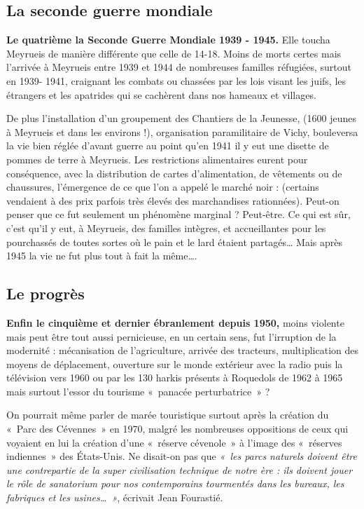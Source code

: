 \subsection{La seconde guerre mondiale}

\textbf{Le quatrième la Seconde Guerre Mondiale 1939 - 1945.}
Elle toucha Meyrueis de manière différente que celle de 14-18. Moins de morts certes mais
l’arrivée à Meyrueis entre 1939 et 1944 de nombreuses familles réfugiées, surtout en 1939-
1941, craignant les combats ou chassées par les lois visant les juifs, les étrangers et les
apatrides qui se cachèrent dans nos hameaux et villages.

De plus l’installation d’un groupement des Chantiers de la Jeunesse, (1600 jeunes à Meyrueis
et dans les environs !), organisation paramilitaire de Vichy, bouleversa la vie bien réglée
d’avant guerre au point qu’en 1941 il y eut une disette de pommes de terre à Meyrueis.
Les restrictions alimentaires eurent pour conséquence, avec la distribution de cartes
d’alimentation, de vêtements ou de chaussures, l’émergence de ce que l’on a appelé le marché
noir : (certains vendaient à des prix parfois très élevés des marchandises rationnées). Peut-on
penser que ce fut seulement un phénomène marginal ? Peut-être. Ce qui est sûr, c’est qu’il y
eut, à Meyrueis, des familles intègres, et accueillantes pour les pourchassés de toutes sortes où
le pain et le lard étaient partagés… Mais après 1945 la vie ne fut plus tout à fait la même….

\subsection{Le progrès}

\textbf{Enfin le cinquième et dernier ébranlement depuis 1950,}
moins violente mais peut être tout aussi pernicieuse, en un certain sens, fut l’irruption de la
modernité : mécanisation de l’agriculture, arrivée des tracteurs, multiplication des moyens de
déplacement, ouverture sur le monde extérieur avec la radio puis la télévision vers 1960 ou
par les 130 harkis présents à Roquedols de 1962 à 1965 mais surtout l’essor du
tourisme «~panacée perturbatrice~» ?

On pourrait même parler de marée touristique surtout après la création du «~Parc des
Cévennes~» en 1970, malgré les nombreuses oppositions de ceux qui voyaient en lui la
création d’une «~réserve cévenole~» à l’image des «~réserves indiennes~» des États-Unis. Ne
disait-on pas que \emph{«~les parcs naturels doivent être une contrepartie de la super civilisation technique de notre ère : ils doivent jouer le rôle de sanatorium pour nos contemporains tourmentés dans les bureaux, les fabriques et les usines…~»}, écrivait Jean Fourastié.

